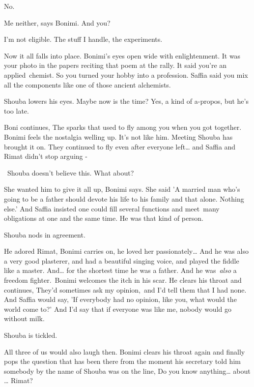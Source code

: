 \documentclass[twoside,11pt]{book}
\begin{document}
{\textquotedbl}No.{\textquotedbl}

{\textquotedbl}Me neither,{\textquotedbl} says Bonimi. {\textquotedbl}And you?{\textquotedbl} 

{\textquotedbl}I'm not eligible. The stuff I handle, the experiments.{\textquotedbl}

{\textquotedbl}Now it all falls into place.{\textquotedbl} Bonimi's eyes open wide with enlightenment. {\textquotedbl}It
was your photo in the papers reciting that poem at the rally. It said you're an applied\ chemist. So you turned your
hobby into a profession. Saffia said you mix all the components like one of those ancient alchemists.{\textquotedbl}

Shouba lowers his eyes. Maybe now is the time? Yes, a kind of a-propos, but he's too late. 

Boni continues, {\textquotedbl}The sparks that used to fly among you when you got together.{\textquotedbl} Bonimi feels
the nostalgia welling up. It's not like him. Meeting Shouba has brought it on. {\textquotedbl}They continued to fly
even after everyone left{\dots}  and Saffia and Rimat didn't stop arguing -{\textquotedbl}

~Shouba doesn't believe this. {\textquotedbl}What about?{\textquotedbl}

{\textquotedbl}She wanted {him} to give it all up,{\textquotedbl} Bonimi says. {\textquotedbl}She said
'A married man who's going to be a father should devote his life to his family and that alone. Nothing else.{}' And
Saffia insisted one could fill several functions and meet\ many obligations at one and the same time. He was that kind
of person.{\textquotedbl} 

Shouba nods in agreement. 

{\textquotedbl}He adored Rimat,{\textquotedbl} Bonimi carries on, {\textquotedbl}he loved her passionately{\dots} And he
was also a very good plasterer, and had a beautiful singing voice, and played the fiddle like a master. And{\dots} for
the shortest time he was a father. And he was\ \textit{also} a freedom fighter.{\textquotedbl}\ Bonimi welcomes the
itch in his scar. He clears his throat and continues, {\textquotedbl}They'd sometimes ask my opinion,\ and I'd tell
them that I had none. And Saffia would say, 'If everybody had no opinion, like you, what would the world come to?' And
I'd say that if everyone was like me, nobody would go without milk.{\textquotedbl}

Shouba is tickled.

{\textquotedbl}All three of us would also laugh then.{\textquotedbl} Bonimi clears his throat again and finally pops the
question that has been there from the moment his secretary told him somebody by the name of Shouba was on the line,
{\textquotedbl}Do you know anything{\dots} about {\dots} Rimat?{\textquotedbl} 
\end{document}
